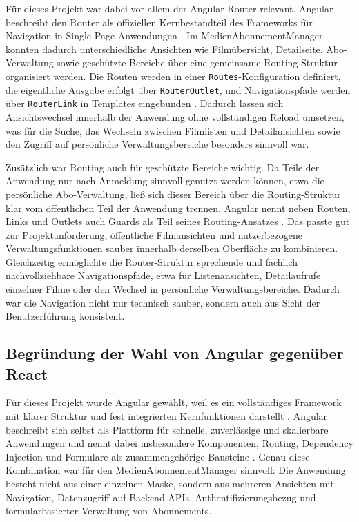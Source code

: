 F\"ur dieses Projekt war dabei vor allem der Angular Router relevant. Angular beschreibt den Router als offiziellen Kernbestandteil des Frameworks f\"ur Navigation in Single-Page-Anwendungen \cite{angular_routing}. Im MedienAbonnementManager konnten dadurch unterschiedliche Ansichten wie Film\"ubersicht, Detailseite, Abo-Verwaltung sowie gesch\"utzte Bereiche \"uber eine gemeinsame Routing-Struktur organisiert werden. Die Routen werden in einer \texttt{Routes}-Konfiguration definiert, die eigentliche Ausgabe erfolgt \"uber \texttt{RouterOutlet}, und Navigationspfade werden \"uber \texttt{RouterLink} in Templates eingebunden \cite{angular_routing}. Dadurch lassen sich Ansichtswechsel innerhalb der Anwendung ohne vollst\"andigen Reload umsetzen, was f\"ur die Suche, das Wechseln zwischen Filmlisten und Detailansichten sowie den Zugriff auf pers\"onliche Verwaltungsbereiche besonders sinnvoll war.

Zus\"atzlich war Routing auch f\"ur gesch\"utzte Bereiche wichtig. Da Teile der Anwendung nur nach Anmeldung sinnvoll genutzt werden k\"onnen, etwa die pers\"onliche Abo-Verwaltung, lie\ss{} sich dieser Bereich \"uber die Routing-Struktur klar vom \"offentlichen Teil der Anwendung trennen. Angular nennt neben Routen, Links und Outlets auch Guards als Teil seines Routing-Ansatzes \cite{angular_routing}. Das passte gut zur Projektanforderung, \"offentliche Filmansichten und nutzerbezogene Verwaltungsfunktionen sauber innerhalb derselben Oberfl\"ache zu kombinieren. Gleichzeitig erm\"oglichte die Router-Struktur sprechende und fachlich nachvollziehbare Navigationspfade, etwa f\"ur Listenansichten, Detailaufrufe einzelner Filme oder den Wechsel in pers\"onliche Verwaltungsbereiche. Dadurch war die Navigation nicht nur technisch sauber, sondern auch aus Sicht der Benutzerf\"uhrung konsistent.

\subsection{Begr\"undung der Wahl von Angular gegen\"uber React}
F\"ur dieses Projekt wurde Angular gew\"ahlt, weil es ein vollst\"andiges Framework mit klarer Struktur und fest integrierten Kernfunktionen darstellt \cite{angular_overview,freeman_angular}. Angular beschreibt sich selbst als Plattform f\"ur schnelle, zuverl\"assige und skalierbare Anwendungen und nennt dabei insbesondere Komponenten, Routing, Dependency Injection und Formulare als zusammengeh\"orige Bausteine \cite{angular_overview}. Genau diese Kombination war f\"ur den MedienAbonnementManager sinnvoll: Die Anwendung besteht nicht aus einer einzelnen Maske, sondern aus mehreren Ansichten mit Navigation, Datenzugriff auf Backend-APIs, Authentifizierungsbezug und formularbasierter Verwaltung von Abonnements.

